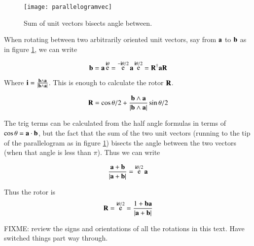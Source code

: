 \documentclass{article}      %
\DeclareMathOperator{\Exp}{e}
\begin{document}
\begin{figure}[htp]
\centering
\texttt{[image: parallelogramvec]}
\caption{Sum of unit vectors bisects angle between.}\label{fig:parallelogramvec}
\end{figure}

When rotating between two arbitrarily oriented unit vectors, 
say from $\mathbf{a}$ to $\mathbf{b}$ as in figure \ref{fig:parallelogramvec}, 
we can write

\[
\Bb = \Ba\Exp^{\Bi\theta} = \Exp^{-\Bi\theta/2}\Ba \Exp^{\Bi\theta/2} = \BR^\dagger \Ba \BR
\]

Where $\mathbf{i} = \frac{\mathbf{b} \wedge \mathbf{a}}{\lvert{\mathbf{b}\wedge \mathbf{a}}\rvert}$.  This is enough to calculate the rotor $\mathbf{R}$.

\[
\mathbf{R} = \cos{\theta/2} + \frac{\mathbf{b} \wedge \mathbf{a}}{\lvert{\mathbf{b}\wedge \mathbf{a}}\rvert}\sin{\theta/2}
\]

The trig terms can be calculated from the half angle formulas in terms of $\cos\theta = \mathbf{a} \cdot \mathbf{b}$, but the fact that
the sum of the two unit vectors (running to the tip of the parallelogram as in figure \ref{fig:parallelogramvec}) bisects
the angle between the two vectors (when that angle is less than $\pi$).  Thus we can write

\begin{equation*}
\frac{\Ba + \Bb}{\abs{\Ba + \Bb}} = \Exp^{\Bi\theta/2} \Ba
\end{equation*}

Thus the rotor is
\[
\BR = \Exp^{\Bi\theta/2} = \frac{1 + \Bb\Ba}{\abs{\Ba + \Bb}} 
\]

FIXME: review the signs and orientations of all the rotations in this text.  Have switched things part way through.
\end{document}
